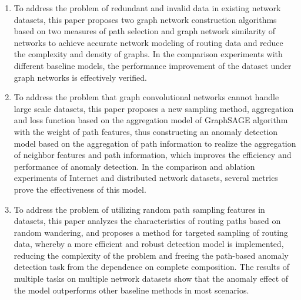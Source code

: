 \begin{englishabstract}
    \begin{enumerate}
        \item To address the problem of redundant and invalid data in existing network datasets, this paper proposes two graph network construction algorithms based on two measures of path selection and graph network similarity of networks to achieve accurate network modeling of routing data and reduce the complexity and density of graphs. In the comparison experiments with different baseline models, the performance improvement of the dataset under graph networks is effectively verified.
        \item To address the problem that graph convolutional networks cannot handle large scale datasets, this paper proposes a new sampling method, aggregation and loss function based on the aggregation model of GraphSAGE algorithm with the weight of path features, thus constructing an anomaly detection model based on the aggregation of path information to realize the aggregation of neighbor features and path information, which improves the efficiency and performance of anomaly detection. In the comparison and ablation experiments of Internet and distributed network datasets, several metrics prove the effectiveness of this model.
        \item To address the problem of utilizing random path sampling features in datasets, this paper analyzes the characteristics of routing paths based on random wandering, and proposes a method for targeted sampling of routing data, whereby a more efficient and robust detection model is implemented, reducing the complexity of the problem and freeing the path-based anomaly detection task from the dependence on complete composition. The results of multiple tasks on multiple network datasets show that the anomaly effect of the model outperforms other baseline methods in most scenarios.
    \end{enumerate}
\end{englishabstract}